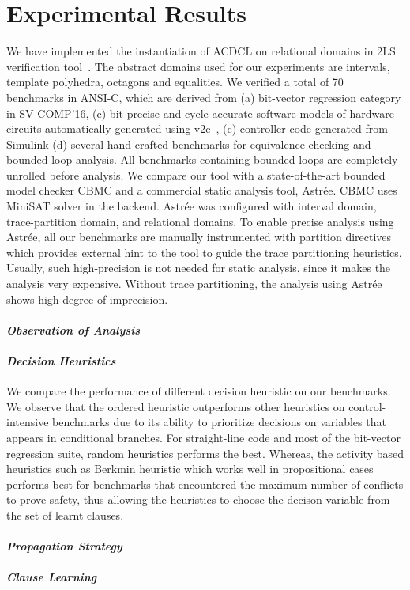 \section{Experimental Results}
We have implemented the instantiation of ACDCL on relational domains 
in 2LS verification tool~\cite{2ls}.  The abstract domains used for 
our experiments are intervals, template polyhedra, octagons and equalities.  
We verified a total of 70 benchmarks in ANSI-C, which are derived from 
(a) bit-vector regression category in SV-COMP'16, (c) bit-precise and 
cycle accurate software models of hardware circuits automatically 
generated using v2c~\cite{mtk2016}, (c) controller code generated 
from Simulink (d) several hand-crafted benchmarks for equivalence 
checking and bounded loop analysis.  All benchmarks containing 
bounded loops are completely unrolled before analysis.  We compare 
our tool with a state-of-the-art bounded model checker CBMC and a 
commercial static analysis tool, Astr{\'e}e.  CBMC uses MiniSAT 
solver in the backend.  Astr{\'e}e was configured with interval 
domain, trace-partition domain, and relational domains.  To enable precise 
analysis using Astr{\'e}e, all our benchmarks are manually instrumented with 
partition directives which provides external hint to the tool to guide 
the trace partitioning heuristics.  Usually, such high-precision is not 
needed for static analysis, since it makes the analysis very expensive.  
Without trace partitioning, the analysis using Astr{\'e}e shows high 
degree of imprecision. 

\paragraph {\em Observation of Analysis}

\paragraph {\em \textbf{Decision Heuristics}} We compare the performance of 
different decision heuristic on our benchmarks.  We observe that 
the ordered heuristic outperforms other heuristics on control-intensive 
benchmarks due to its ability to prioritize decisions on variables that 
appears in conditional branches.  For straight-line code and most of 
the bit-vector regression suite, random heuristics performs the best.  
Whereas, the activity based heuristics such as Berkmin heuristic which 
works well in propositional cases performs best for benchmarks that 
encountered the maximum number of conflicts to prove safety, thus allowing 
the heuristics to choose the decison variable from the set of learnt clauses.   

\paragraph {\em \textbf{Propagation Strategy}}      

\paragraph {\em \textbf{Clause Learning}}      

  
